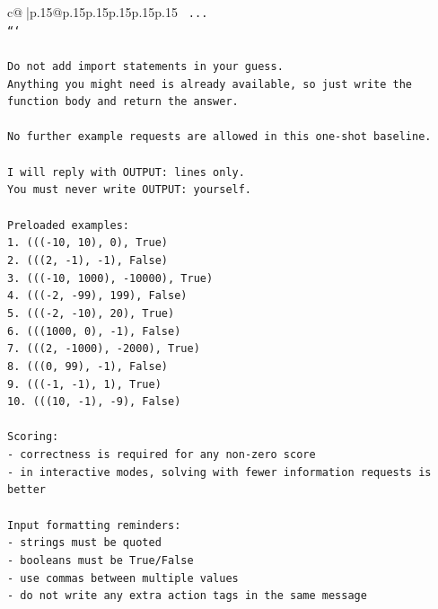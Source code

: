 \documentclass{article}
\begin{document}
{\begin{supertabular}{c@{$\;$}|p{.15\linewidth}@{}p{.15\linewidth}p{.15\linewidth}p{.15\linewidth}p{.15\linewidth}p{.15\linewidth}}
{{{\texttt{    ...} \\
\texttt{```} \\
\\ 
\texttt{Do not add import statements in your guess.} \\
\texttt{Anything you might need is already available, so just write the function body and return the answer.} \\
\\ 
\texttt{No further example requests are allowed in this one{-}shot baseline.} \\
\\ 
\texttt{I will reply with OUTPUT: lines only.} \\
\texttt{You must never write OUTPUT: yourself.} \\
\\ 
\texttt{Preloaded examples:} \\
\texttt{1. ((({-}10, 10), 0), True)} \\
\texttt{2. (((2, {-}1), {-}1), False)} \\
\texttt{3. ((({-}10, 1000), {-}10000), True)} \\
\texttt{4. ((({-}2, {-}99), 199), False)} \\
\texttt{5. ((({-}2, {-}10), 20), True)} \\
\texttt{6. (((1000, 0), {-}1), False)} \\
\texttt{7. (((2, {-}1000), {-}2000), True)} \\
\texttt{8. (((0, 99), {-}1), False)} \\
\texttt{9. ((({-}1, {-}1), 1), True)} \\
\texttt{10. (((10, {-}1), {-}9), False)} \\
\\ 
\texttt{Scoring:} \\
\texttt{{-} correctness is required for any non{-}zero score} \\
\texttt{{-} in interactive modes, solving with fewer information requests is better} \\
\\ 
\texttt{Input formatting reminders:} \\
\texttt{{-} strings must be quoted} \\
\texttt{{-} booleans must be True/False} \\
\texttt{{-} use commas between multiple values} \\
\texttt{{-} do not write any extra action tags in the same message} \\
\\ 
}}}
\end{supertabular}}
\end{document}
